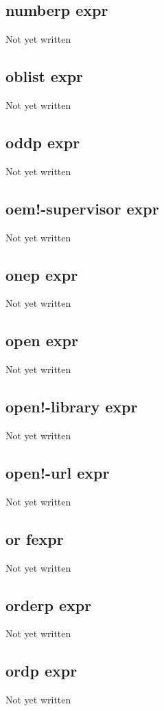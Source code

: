 \documentclass[a4paper,11pt]{article}
\begin{document}
\subsection{\ttfamily numberp expr}
Not yet written

\subsection{\ttfamily oblist expr}
Not yet written

\subsection{\ttfamily oddp expr}
Not yet written

\subsection{\ttfamily oem!-supervisor expr}
Not yet written

\subsection{\ttfamily onep expr}
Not yet written

\subsection{\ttfamily open expr}
Not yet written

\subsection{\ttfamily open!-library expr}
Not yet written

\subsection{\ttfamily open!-url expr}
Not yet written

\subsection{\ttfamily or fexpr}
Not yet written

\subsection{\ttfamily orderp expr}
Not yet written

\subsection{\ttfamily ordp expr}
Not yet written
\end{document}
